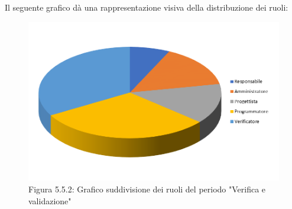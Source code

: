 Il seguente grafico dà una rappresentazione visiva della distribuzione dei ruoli: \\
\begin{figure} [H]
	\centering
	\includegraphics[scale=1]{Res/ExcelGrafici/Grafici/RipianificazioneRuoli.png}
	\caption{Figura 5.5.2: Grafico suddivisione dei ruoli del periodo "Verifica e validazione"}\label{}
\end{figure}

\pagebreak
